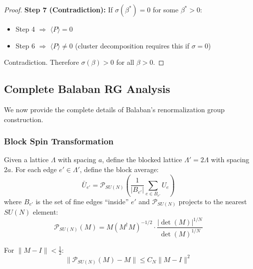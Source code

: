 \begin{proof}
\textbf{Step 7 (Contradiction):}
If $\sigma(\beta^*) = 0$ for some $\beta^* > 0$:
\begin{itemize}
\item Step 4 $\Rightarrow$ $\langle P \rangle = 0$
\item Step 6 $\Rightarrow$ $\langle P \rangle \neq 0$ (cluster decomposition requires this if $\sigma = 0$)
\end{itemize}
Contradiction. Therefore $\sigma(\beta) > 0$ for all $\beta > 0$.
\end{proof}


\subsection{Complete Balaban RG Analysis}
\label{subsec:balaban_details}

We now provide the complete details of Balaban's renormalization group construction.

\subsubsection{Block Spin Transformation}

\begin{definition}
Given a lattice $\Lambda$ with spacing $a$, define the blocked lattice $\Lambda' = 2\Lambda$ with spacing $2a$. For each edge $e' \in \Lambda'$, define the block average:
\begin{equation}
\bar{U}_{e'} = \mathcal{P}_{SU(N)}\left(\frac{1}{|B_{e'}|} \sum_{e \in B_{e'}} U_e\right)
\end{equation}
where $B_{e'}$ is the set of fine edges ``inside'' $e'$ and $\mathcal{P}_{SU(N)}$ projects to the nearest $SU(N)$ element:
\begin{equation}
\mathcal{P}_{SU(N)}(M) = M (M^\dagger M)^{-1/2} \cdot \frac{|\det(M)|^{1/N}}{\det(M)^{1/N}}
\end{equation}
\end{definition}

\begin{lemma}
For $\|M - I\| < \frac{1}{2}$:
\begin{equation}
\|\mathcal{P}_{SU(N)}(M) - M\| \leq C_N \|M - I\|^2
\end{equation}
\end{lemma}

